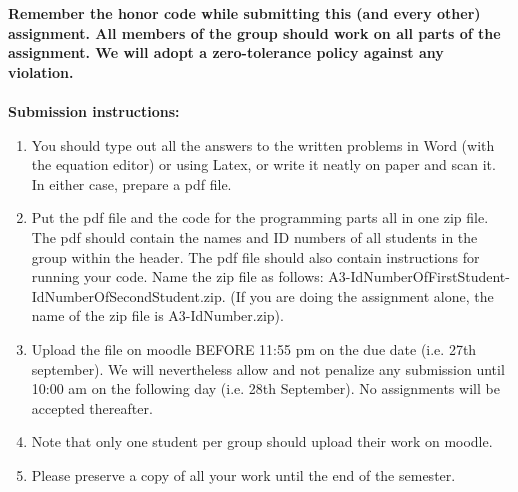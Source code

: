 \documentclass[11pt]{article}
\begin{document}
\maketitle

\textbf{Remember the honor code while submitting this (and every other) assignment. All members of the group should work on all parts of the assignment. We will adopt a \textbf{zero-tolerance policy} against any violation.}
\\
\\
\textbf{Submission instructions:} 
\begin{enumerate}
\item You should type out all the answers to the written problems in Word (with the equation editor) or using Latex, or write it neatly on paper and scan it. In either case, prepare a pdf file. 
\item Put the pdf file and the code for the programming parts all in one zip file. The pdf should contain the names and ID numbers of all students in the group within the header. The pdf file should also contain instructions for running your code. Name the zip file as follows: A3-IdNumberOfFirstStudent-IdNumberOfSecondStudent.zip. (If you are doing the assignment alone, the name of the zip file is A3-IdNumber.zip). 
\item Upload the file on moodle BEFORE 11:55 pm on the due date (i.e. 27th september). We will nevertheless allow and not penalize any submission until 10:00 am on the following day (i.e. 28th September). No assignments will be accepted thereafter. 
\item Note that only one student per group should upload their work on moodle. 
\item Please preserve a copy of all your work until the end of the semester. 
\end{enumerate}
\end{document}
